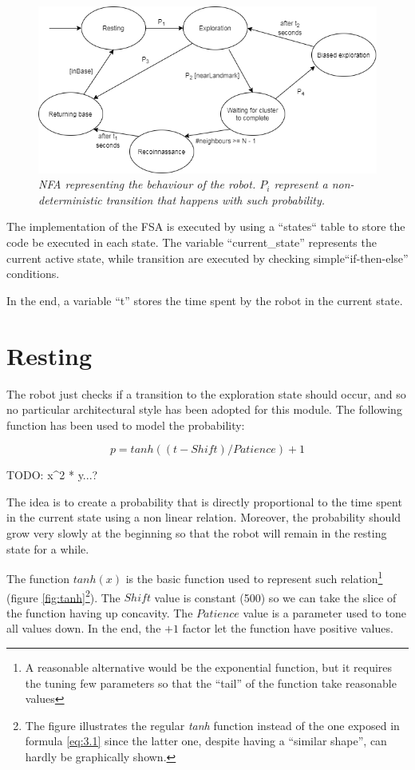 \begin{figure}[H]
\centering
\includegraphics[width=\linewidth]{images/NFA.png}
\caption{\textit{NFA representing the behaviour of the robot. $P_i$ represent a non-deterministic transition that happens with such probability.}}
\label{fig:NFA}
\end{figure}

The implementation of the FSA is executed by using a ``states`` table to store the code be executed in each state. The variable ``current\_state'' represents the current active state, while transition are executed by checking simple``if-then-else'' conditions.

\noindent
In the end, a variable ``t'' stores the time spent by the robot in the current state.

\section{Resting}

The robot just checks if a transition to the exploration state should occur, and so no particular architectural style has been adopted for this module. The following function has been used to model the probability:

\begin{equation}
    p = tanh((t - Shift) / Patience) + 1 \tag{3.1}\label{eq:3.1}
\end{equation}

TODO: x^2 * y...?

\noindent
The idea is to create a probability that is directly proportional to the time spent in the current state using a non linear relation. Moreover, the probability should grow very slowly at the beginning so that the robot will remain in the resting state for a while. 

\noindent
The function $tanh(x)$ is the basic function used to represent such relation\footnote{A reasonable alternative would be the exponential function, but it requires the tuning few parameters so that the ``tail'' of the function take reasonable values} (figure \ref{fig:tanh}\footnote{The figure illustrates the regular \textit{tanh} function instead of the one exposed in formula \ref{eq:3.1} since the latter one, despite having a ``similar shape'', can hardly be graphically shown.}). The $Shift$ value is constant (500) so we can take the slice of the function having up concavity. The $Patience$ value is a parameter used to tone all values down. In the end, the $+1$ factor let the function have positive values.  

